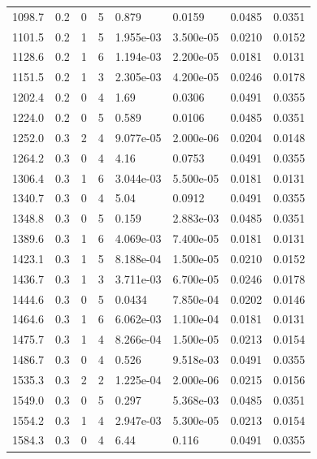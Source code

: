\documentclass[preview]{standalone}
\begin{document}
{{{\begin{tabular}{L{1.2cm}C{1.2cm} C{0.3cm}C{0.5cm} C{1.4cm}C{1.4cm} C{1.4cm}C{1.4cm}}
  1098.7  &   0.2  & 0     &  5 &  0.879  & 0.0159  & 0.0485 &  0.0351   \\ 
  1101.5  &   0.2  & 1     &  5 &  1.955e-03  & 3.500e-05  & 0.0210 &  0.0152   \\ 
  1128.6  &   0.2  & 1     &  6 &  1.194e-03  & 2.200e-05  & 0.0181 &  0.0131   \\ 
  1151.5  &   0.2  & 1     &  3 &  2.305e-03  & 4.200e-05  & 0.0246 &  0.0178   \\ 
  1202.4  &   0.2  & 0     &  4 &  1.69  & 0.0306  & 0.0491 &  0.0355   \\ 
  1224.0  &   0.2  & 0     &  5 &  0.589  & 0.0106  & 0.0485 &  0.0351   \\ 
  1252.0  &   0.3  & 2     &  4 &  9.077e-05  & 2.000e-06  & 0.0204 &  0.0148   \\ 
  1264.2  &   0.3  & 0     &  4 &  4.16  & 0.0753  & 0.0491 &  0.0355   \\ 
  1306.4  &   0.3  & 1     &  6 &  3.044e-03  & 5.500e-05  & 0.0181 &  0.0131   \\ 
  1340.7  &   0.3  & 0     &  4 &  5.04  & 0.0912  & 0.0491 &  0.0355   \\ 
  1348.8  &   0.3  & 0     &  5 &  0.159  & 2.883e-03  & 0.0485 &  0.0351   \\ 
  1389.6  &   0.3  & 1     &  6 &  4.069e-03  & 7.400e-05  & 0.0181 &  0.0131   \\ 
  1423.1  &   0.3  & 1     &  5 &  8.188e-04  & 1.500e-05  & 0.0210 &  0.0152   \\ 
  1436.7  &   0.3  & 1     &  3 &  3.711e-03  & 6.700e-05  & 0.0246 &  0.0178   \\ 
  1444.6  &   0.3  & 0     &  5 &  0.0434  & 7.850e-04  & 0.0202 &  0.0146   \\ 
  1464.6  &   0.3  & 1     &  6 &  6.062e-03  & 1.100e-04  & 0.0181 &  0.0131   \\ 
  1475.7  &   0.3  & 1     &  4 &  8.266e-04  & 1.500e-05  & 0.0213 &  0.0154   \\ 
  1486.7  &   0.3  & 0     &  4 &  0.526  & 9.518e-03  & 0.0491 &  0.0355   \\ 
  1535.3  &   0.3  & 2     &  2 &  1.225e-04  & 2.000e-06  & 0.0215 &  0.0156   \\ 
  1549.0  &   0.3  & 0     &  5 &  0.297  & 5.368e-03  & 0.0485 &  0.0351   \\ 
  1554.2  &   0.3  & 1     &  4 &  2.947e-03  & 5.300e-05  & 0.0213 &  0.0154   \\ 
  1584.3  &   0.3  & 0     &  4 &  6.44  & 0.116  & 0.0491 &  0.0355   \\ 

\end{tabular}}}}
\end{document}
